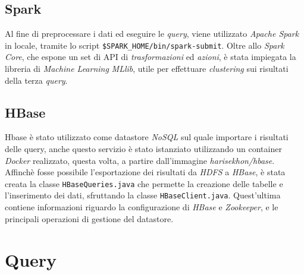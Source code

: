 \documentclass[conference]{IEEEtran}
\begin{document}
\subsection*{\textbf{Spark}}
Al fine di preprocessare i dati ed eseguire le \emph{query}, viene utilizzato \emph{Apache Spark} in locale, tramite lo script \texttt{\$SPARK\_HOME/bin/spark-submit}. Oltre allo \emph{Spark Core}, che espone un set di API di \emph{trasformazioni} ed \emph{azioni}, \`{e} stata impiegata la libreria di \emph{Machine Learning} \emph{MLlib}, utile per effettuare \emph{clustering} sui risultati della terza \emph{query}.

\subsection*{\textbf{HBase}}
Hbase \`{e} stato utilizzato come datastore \emph{NoSQL} sul quale importare i risultati delle query, anche questo servizio \`{e} stato istanziato utilizzando un container \emph{Docker} realizzato,
questa volta, a partire dall'immagine \emph{harisekhon/hbase}. Affinch\`{e} fosse possibile
l'esportazione dei risultati da \emph{HDFS} a \emph{HBase}, \`{e} stata creata la classe \texttt{HBaseQueries.java} che permette la creazione delle tabelle e l'inserimento dei dati, sfruttando la classe \texttt{HBaseClient.java}. Quest'ultima contiene informazioni riguardo la configurazione di \emph{HBase} e \emph{Zookeeper}, e le principali operazioni di gestione del datastore.\\
\section{\textbf{Query}}
\end{document}
